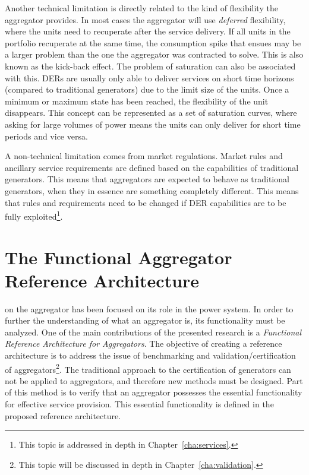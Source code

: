 Another technical limitation is directly related to the kind of flexibility the aggregator provides. In most cases the aggregator will use \emph{deferred} flexibility, where the units need to recuperate after the service delivery. If all units in the portfolio recuperate at the same time, the consumption spike that ensues may be a larger problem than the one the aggregator was contracted to solve. This is also known as the kick-back effect. The problem of saturation can also be associated with this. DERs are usually only able to deliver services on short time horizons (compared to traditional generators) due to the limit size of the units. Once a minimum or maximum state has been reached, the flexibility of the unit disappears. This concept can be represented as a set of saturation curves, where asking for large volumes of power means the units can only deliver for short time periods and vice versa.

A non-technical limitation comes from market regulations. Market rules and ancillary service requirements are defined based on the capabilities of traditional generators. This means that aggregators are expected to behave as traditional generators, when they in essence are something completely different. This means that rules and requirements need to be changed if DER capabilities are to be fully exploited\footnote{This topic is addressed in depth in Chapter~\ref{cha:services}.}.

\section{The Functional Aggregator Reference Architecture}\label{sec:MAINaggrefarch}
 on the aggregator has been focused on its role in the power system. In order to further the understanding of what an aggregator is, its functionality must be analyzed. One of the main contributions of the presented research is a \emph{Functional Reference Architecture for Aggregators}. The objective of creating a reference architecture is to address the issue of benchmarking and validation/certification of aggregators\footnote{This topic will be discussed in depth in Chapter~\ref{cha:validation}.}. The traditional approach to the certification of generators can not be applied to aggregators, and therefore new methods must be designed. Part of this method is to verify that an aggregator possesses the essential functionality for effective service provision. This essential functionality is defined in the proposed reference architecture.

